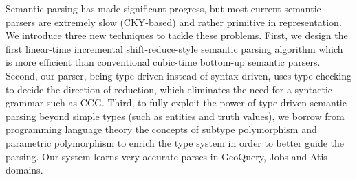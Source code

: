 Semantic parsing has made significant progress, but most current semantic parsers are extremely slow (CKY-based) and rather primitive in representation. We introduce three new techniques to tackle these problems. First, we design the first linear-time incremental shift-reduce-style semantic parsing algorithm which is more efficient than conventional cubic-time bottom-up semantic parsers. Second, our parser, being type-driven instead of syntax-driven, uses type-checking to decide the direction of reduction, which eliminates the need for a syntactic grammar such as CCG. Third, to fully exploit the power of type-driven semantic parsing beyond simple types (such as entities and truth values), we borrow from programming language theory the concepts of subtype polymorphism and parametric polymorphism to enrich the type system in order to better guide the parsing. Our system learns very accurate parses in GeoQuery, Jobs and Atis domains.
